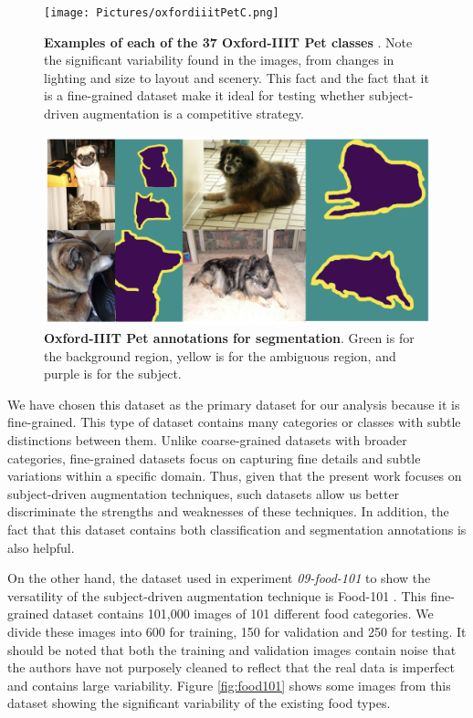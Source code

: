 \begin{figure}
    \centering
    \texttt{[image: Pictures/oxfordiiitPetC.png]} 
    \caption{\textbf{Examples of each of the 37 Oxford-IIIT Pet classes} \cite{Parkhi2012CatsAD}. Note the significant variability found in the images, from changes in lighting and size to layout and scenery. This fact and the fact that it is a fine-grained dataset make it ideal for testing whether subject-driven augmentation is a competitive strategy.}
    \label{fig:oxfordiiitPetC}
\end{figure}

\begin{figure}
    \centering
    \includegraphics[width=1\textwidth]{Pictures/oxfordiiitPetS.png} 
    \caption{\textbf{Oxford-IIIT Pet annotations for segmentation}. Green is for the background region, yellow is for the ambiguous region, and purple is for the subject. }
    \label{fig:oxfordiiitPetS}
\end{figure}

We have chosen this dataset as the primary dataset for our analysis because it is fine-grained. This type of dataset contains many categories or classes with subtle distinctions between them. Unlike coarse-grained datasets with broader categories, fine-grained datasets focus on capturing fine details and subtle variations within a specific domain. Thus, given that the present work focuses on subject-driven augmentation techniques, such datasets allow us better discriminate the strengths and weaknesses of these techniques. In addition, the fact that this dataset contains both classification and segmentation annotations is also helpful.

On the other hand, the dataset used in experiment \textit{09-food-101} to show the versatility of the subject-driven augmentation technique is Food-101 \cite{bossard14}. This fine-grained dataset contains 101,000 images of 101 different food categories. We divide these images into 600 for training, 150 for validation and 250 for testing. It should be noted that both the training and validation images contain noise that the authors have not purposely cleaned to reflect that the real data is imperfect and contains large variability. Figure \ref{fig:food101} shows some images from this dataset showing the significant variability of the existing food types.

